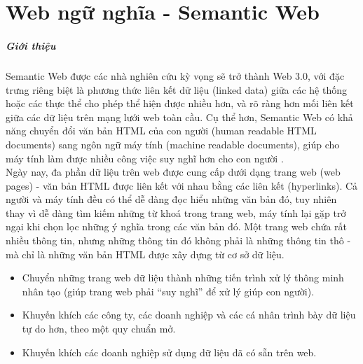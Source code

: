 \chapter{Web ngữ nghĩa - Semantic Web}
\paragraph{Giới thiệu}
Semantic Web được các nhà nghiên cứu kỳ vọng sẽ trở thành Web 3.0, với đặc trưng riêng biệt là phương thức liên kết dữ liệu (linked data) giữa các hệ thống hoặc các thực thể cho phép thể hiện được nhiều hơn, và rõ ràng hơn mối liên kết giữa các dữ liệu trên mạng lưới web toàn cầu. Cụ thể hơn, Semantic Web có khả năng chuyển đổi văn bản HTML của con người (human readable HTML documents) sang ngôn ngữ máy tính (machine readable documents), giúp cho máy tính làm được nhiều công việc suy nghĩ hơn cho con người \cite{semantic1}.
\\
Ngày nay, đa phần dữ liệu trên web được cung cấp dưới dạng trang web (web pages) - văn bản HTML được liên kết với nhau bằng các liên kết (hyperlinks). Cả người và máy tính đều có thể dễ dàng đọc hiểu những văn bản đó, tuy nhiên thay vì dễ dàng tìm kiếm những từ khoá trong trang web, máy tính lại gặp trở ngại khi chọn lọc những ý nghĩa trong các văn bản đó. Một trang web chứa rất nhiều thông tin, nhưng những thông tin đó không phải là những thông tin thô - mà chỉ là những văn bản HTML được xây dựng từ cơ sở dữ liệu.

\begin{itemize}
\item Chuyển những trang web dữ liệu thành những tiến trình xử lý thông minh nhân tạo (giúp trang web phải “suy nghĩ” để xử lý giúp con người).
\item Khuyến khích các công ty, các doanh nghiệp và các cá nhân trình bày dữ liệu tự do hơn, theo một quy chuẩn mở.
\item Khuyến khích các doanh nghiệp sử dụng dữ liệu đã có sẵn trên web.
\end{itemize}

